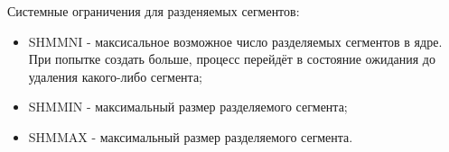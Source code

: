 Системные ограничения для разденяемых сегментов:
\begin{itemize}
	\item SHMMNI - максисальное возможное число разделяемых сегментов в ядре. При попытке создать больше, процесс перейдёт в состояние ожидания до удаления какого-либо сегмента;
	\item SHMMIN - максимальный размер разделяемого сегмента;
	\item SHMMAX - максимальный размер разделяемого сегмента.
\end{itemize}